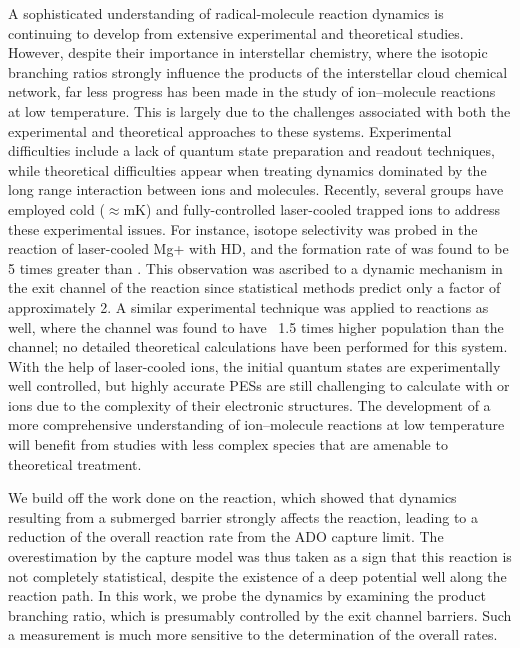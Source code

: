 A sophisticated understanding of radical-molecule reaction dynamics is continuing to develop from extensive experimental and theoretical studies. However, despite their importance in interstellar chemistry, where the isotopic branching ratios strongly influence the products of the interstellar cloud chemical network,\cite{Millar2005} far less progress has been made in the study of ion–molecule reactions at low temperature. This is largely due to the challenges associated with both the experimental and theoretical approaches to these systems.\cite{Clary1990,Dateo1989,Adams1976,Armentrout2002,Sims2002,Smith2000,Snow2008} Experimental difficulties include a lack of quantum state preparation and readout techniques, while theoretical difficulties appear when treating dynamics dominated by the long range interaction between ions and molecules. Recently, several groups have employed cold ($\approx$mK) and fully-controlled laser-cooled trapped ions to address these experimental issues. For instance, isotope selectivity was probed in the reaction of laser-cooled Mg+ with HD,\cite{Staanum2008} and the formation rate of  was found to be 5 times greater than . This observation was ascribed to a dynamic mechanism in the exit channel of the reaction since statistical methods predict only a factor of approximately 2.\cite{Dalleska2005} A similar experimental technique was applied to  reactions as well,\cite{Hansen2012} where the  channel was found to have ~1.5 times higher population than the  channel; no detailed theoretical calculations have been performed for this system. With the help of laser-cooled ions, the initial quantum states are experimentally well controlled, but highly accurate PESs are still challenging to calculate with  or  ions due to the complexity of their electronic structures. The development of a more comprehensive understanding of ion–molecule reactions at low temperature will benefit from studies with less complex species that are amenable to theoretical treatment.

We build off the work done on the  reaction, which showed that dynamics resulting from a submerged barrier strongly affects the reaction, leading to a reduction of the overall reaction rate from the ADO capture limit. The overestimation by the capture model was thus taken as a sign that this reaction is not completely statistical, despite the existence of a deep  potential well along the reaction path. In this work, we probe the dynamics by examining the product branching ratio, which is presumably controlled by the exit channel barriers. Such a measurement is much more sensitive to the determination of the overall rates.

